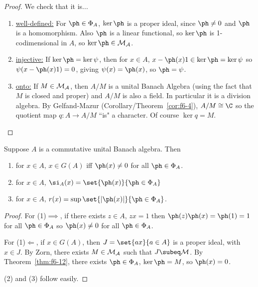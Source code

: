 \begin{proof}
We check that it is...
\begin{enumerate}
\item
\ul{well-defined:} For $\ph\in \Phi_A$, $\ker\ph$ is a proper ideal, since $\ph\ne 0$ and $\ph$ is a homomorphism. Also $\ph$ is a linear functional, so $\ker \ph$ is 1-codimensional in $A$, so $\ker\ph\in \cal M_A$.
\item
\ul{injective:} If $\ker \ph=\ker \psi$, then for $x\in A$, $x-\ph(x)1\in \ker \ph=\ker \psi$ so $\psi(x-\ph(x)1)=0$, giving $\psi(x)=\ph(x)$, so $\ph=\psi$.
\item
\ul{onto:} If $M\in \cal M_A$, then $A/M$ is a unital Banach Algebra (using the fact that $M$ is closed and proper) and $A/M$ is also a field. In particular it is a division algebra. By Gelfand-Mazur (Corollary/Theorem~\ref{cor:f6-4}), $A/M\cong \C$ so the quotient map $q:A\to A/M$ ``is" a character. Of course $\ker q=M$.
\end{enumerate}
\end{proof}
\begin{cor}
Suppose $A$ is a commutative unital Banach algebra. Then
\begin{enumerate}
\item
for $x\in A$, $x\in G(A)$ iff $\ph(x)\ne 0$ for all $\ph\in \Phi_A$.
\item
for $x\in A$, $\si_A(x)=\set{\ph(x)}{\ph\in \Phi_A}$
\item
for $x\in A$, $r(x)=\sup\set{|\ph(x)|}{\ph\in \Phi_A}$.
\end{enumerate}
\end{cor}
\begin{proof}
For (1)$\implies$, if there exists $z\in A$, $zx=1$ then $\ph(z)\ph(x)=\ph(1)=1$ for all $\ph\in \Phi_A$ so $\ph(x)\ne 0$ for all $\ph\in \Phi_A$. 

For (1)$\Leftarrow$, if $x\in G(A)$, then $J=\set{ax}{a\in A}$ is a proper ideal, with $x\in J$. By Zorn, there exists $M\in \cal M_A$ such that $J\subeq \cal M$. By Theorem~\ref{thm:f6-12}, there exists $\ph\in \Phi_A$, $\ker\ph=M$, so $\ph(x)=0$.

(2) and (3) follow easily.
\end{proof}
